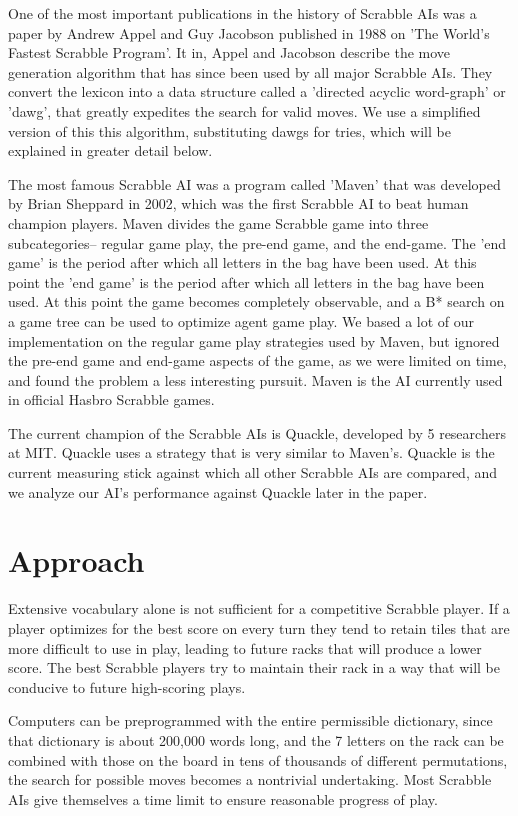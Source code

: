\documentclass[12pt]{article}
\begin{document}
One of the most important publications in the history of Scrabble AIs
was a paper by Andrew Appel and Guy Jacobson published in 1988 on 'The
World's Fastest Scrabble Program'. It in, Appel and Jacobson describe
the move generation algorithm that has since been used by all major
Scrabble AIs. They convert the lexicon into a data structure called a
'directed acyclic word-graph' or 'dawg', that greatly expedites the
search for valid moves. We use a simplified version of this this
algorithm, substituting dawgs for tries, which will be explained in
greater detail below.

The most famous Scrabble AI was a program called 'Maven' that was
developed by Brian Sheppard in 2002, which was the first Scrabble AI
to beat human champion players.  Maven divides the game Scrabble game
into three subcategories-- regular game play, the pre-end game, and
the end-game. The 'end game' is the period after which all letters in
the bag have been used. At this point the 'end game' is the period
after which all letters in the bag have been used. At this point the
game becomes completely observable, and a B* search on a game tree can
be used to optimize agent game play. We based a lot of our
implementation on the regular game play strategies used by Maven, but
ignored the pre-end game and end-game aspects of the game, as we were
limited on time, and found the problem a less interesting
pursuit. Maven is the AI currently used in official Hasbro Scrabble
games.

The current champion of the Scrabble AIs is Quackle, developed by 5
researchers at MIT. Quackle uses a strategy that is very similar to
Maven's. Quackle is the current measuring stick against which all
other Scrabble AIs are compared, and we analyze our AI's performance
against Quackle later in the paper.

\section*{Approach}
Extensive vocabulary alone is not sufficient for a competitive
Scrabble player. If a player optimizes for the best score on every
turn they tend to retain tiles that are more difficult to use in play,
leading to future racks that will produce a lower score. The best
Scrabble players try to maintain their rack in a way that will be
conducive to future high-scoring plays.

Computers can be preprogrammed with the entire permissible dictionary,
since that dictionary is about 200,000 words long, and the 7 letters
on the rack can be combined with those on the board in tens of
thousands of different permutations, the search for possible moves
becomes a nontrivial undertaking. Most Scrabble AIs give themselves a
time limit to ensure reasonable progress of play.
\end{document}
